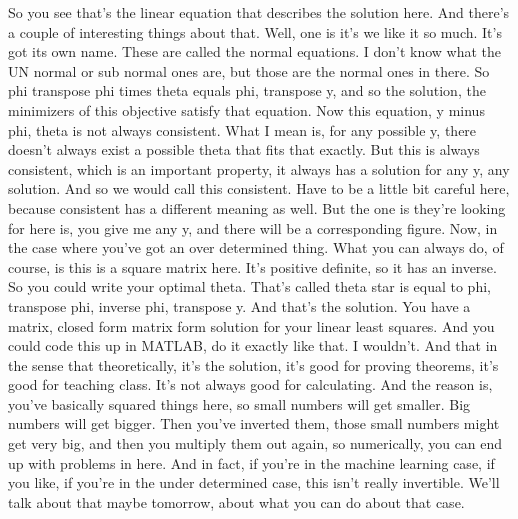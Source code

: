 \documentclass[11pt,a4paper]{article}
\begin{document}
So you see that's the linear equation that describes the solution here. And there's a couple of interesting things about that. Well, one is it's we like it so much. It's got its own name. These are called the normal equations. I don't know what the UN normal or sub normal ones are, but those are the normal ones in there. So phi transpose phi times theta equals phi, transpose y, and so the solution, the minimizers of this objective satisfy that equation. Now this equation, y minus phi, theta is not always consistent. What I mean is, for any possible y, there doesn't always exist a possible theta that fits that exactly. But this is always consistent, which is an important property, it always has a solution for any y, any solution. And so we would call this consistent. Have to be a little bit careful here, because consistent has a different meaning as well. But the one is they're looking for here is, you give me any y, and there will be a corresponding figure. Now, in the case where you've got an over determined thing. What you can always do, of course, is this is a square matrix here. It's positive definite, so it has an inverse. So you could write your optimal theta. That's called theta star is equal to phi, transpose phi, inverse phi, transpose y. And that's the solution. You have a matrix, closed form matrix form solution for your linear least squares. And you could code this up in MATLAB, do it exactly like that. I wouldn't. And that in the sense that theoretically, it's the solution, it's good for proving theorems, it's good for teaching class. It's not always good for calculating. And the reason is, you've basically squared things here, so small numbers will get smaller. Big numbers will get bigger. Then you've inverted them, those small numbers might get very big, and then you multiply them out again, so numerically, you can end up with problems in here. And in fact, if you're in the machine learning case, if you like, if you're in the under determined case, this isn't really invertible. We'll talk about that maybe tomorrow, about what you can do about that case.
\end{document}
